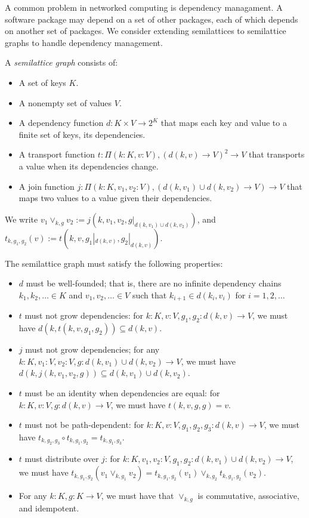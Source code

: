 \documentclass{article}
\begin{document}
        A common problem in networked computing is dependency managament. A software package may depend on a set of other packages, each of which depends on another set of packages. We consider extending semilattices to semilattice graphs to handle dependency management.
        
        A \emph{semilattice graph} consists of:

        \begin{itemize}
            \item A set of keys $K$.
            \item A nonempty set of values $V$.
            \item A dependency function $d : K \times V \rightarrow 2^K$ that maps each key and value to a finite set of keys, its dependencies.
            \item A transport function $t : \Pi (k : K, v : V), (d(k, v) \rightarrow V)^2 \rightarrow V$ that transports a value when its dependencies change.
            \item A join function $j : \Pi (k : K, v_1, v_2 : V), (d(k, v_1) \cup d(k, v_2) \rightarrow V) \rightarrow V$ that maps two values to a value given their dependencies.
        \end{itemize}

        We write $v_1 \vee_{k, g} v_2 := j(k, v_1, v_2, g|_{d(k, v_1) \cup d(k, v_2)})$, and $t_{k, g_1, g_2}(v) := t(k, v, g_1|_{d(k, v)}, g_2|_{d(k, v)})$.

        The semilattice graph must satisfy the following properties:

        \begin{itemize}
            \item $d$ must be well-founded; that is, there are no infinite dependency chains $k_1, k_2, \ldots \in K$ and $v_1, v_2, \ldots \in V$ such that $k_{i+1} \in d(k_i, v_i)$ for $i = 1, 2, \ldots$
            \item $t$ must not grow dependencies: for $k : K, v : V, g_1, g_2 : d(k, v) \rightarrow V$, we must have $d(k, t(k, v, g_1, g_2)) \subseteq d(k, v)$.
            \item $j$ must not grow dependencies; for any $k : K, v_1 : V, v_2: V, g: d(k, v_1) \cup d(k, v_2) \rightarrow V$, we must have $d(k, j(k, v_1, v_2, g)) \subseteq d(k, v_1) \cup d(k, v_2)$.
            \item $t$ must be an identity when dependencies are equal: for $k : K, v : V, g : d(k, v) \rightarrow V$, we must have $t(k, v, g, g) = v$.
            \item $t$ must not be path-dependent: for $k : K, v : V, g_1, g_2, g_3: d(k, v) \rightarrow V$, we must have $t_{k, g_2, g_3} \circ t_{k, g_1, g_2} = t_{k, g_1, g_3}$.
            \item $t$ must distribute over $j$: for $k : K, v_1, v_2 : V, g_1, g_2 : d(k, v_1) \cup d(k, v_2) \rightarrow V$, we must have $t_{k, g_1, g_2}(v_1 \vee_{k, g_1} v_2) = t_{k, g_1, g_2}(v_1) \vee_{k, g_2} t_{k, g_1, g_2}(v_2)$.
            \item For any $k: K, g : K \rightarrow V$, we must have that $\vee_{k, g}$ is commutative, associative, and idempotent.
        \end{itemize}
\end{document}
